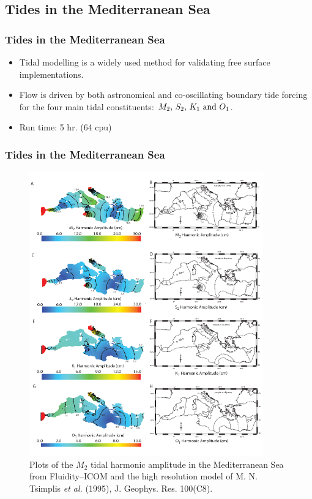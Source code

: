 \subsection{Tides in the Mediterranean Sea}

\begin{frame}
    \frametitle{Tides in the Mediterranean Sea}
\begin{itemize}
\item Tidal modelling is a widely used method for validating free surface implementations.
\item Flow is driven by both astronomical and co-oscillating boundary tide forcing for the four main tidal constituents: \mbox{$M_2, \, S_2, \, K_1 \,\, {\rm and} \,\, O_1$}.
\item Run time: 5 hr. (64 cpu)
\end{itemize}
\end{frame}
%
\begin{frame}
    \frametitle{Tides in the Mediterranean Sea}
\begin{figure}
\centering
\includegraphics[width=0.9\textwidth, clip = True, trim = 5mm 180mm 0mm 0mm]{./tides_in_the_Mediterranean_Sea/amp.png}
\caption{Plots of the $M_2$ tidal harmonic amplitude in the Mediterranean Sea from Fluidity--ICOM and the high resolution
model of M. N. Tsimplis {\it et al.} (1995), J. Geophys. Res. 100(C8).}
\end{figure}
\end{frame}
